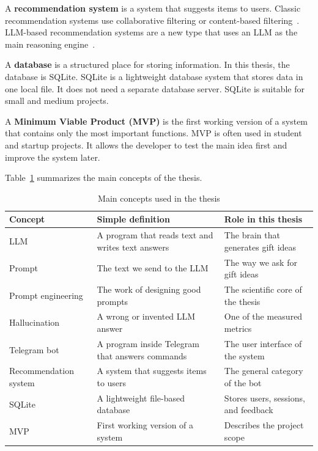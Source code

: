 A \textbf{recommendation system} is a system that suggests items to users. Classic recommendation systems use collaborative filtering or content-based filtering~\cite{ricci2015recommender}. LLM-based recommendation systems are a new type that uses an LLM as the main reasoning engine~\cite{wu2024survey}.

A \textbf{database} is a structured place for storing information. In this thesis, the database is SQLite. SQLite is a lightweight database system that stores data in one local file. It does not need a separate database server. SQLite is suitable for small and medium projects.

A \textbf{Minimum Viable Product (MVP)} is the first working version of a system that contains only the most important functions. MVP is often used in student and startup projects. It allows the developer to test the main idea first and improve the system later.

Table~\ref{tab:concepts} summarizes the main concepts of the thesis.

\begin{table}[H]
\centering
\caption{Main concepts used in the thesis}
\label{tab:concepts}
\begin{tabular}{p{3.5cm} p{5cm} p{5cm}}
\toprule
\textbf{Concept} & \textbf{Simple definition} & \textbf{Role in this thesis} \\
\midrule
LLM & A program that reads text and writes text answers & The brain that generates gift ideas \\
Prompt & The text we send to the LLM & The way we ask for gift ideas \\
Prompt engineering & The work of designing good prompts & The scientific core of the thesis \\
Hallucination & A wrong or invented LLM answer & One of the measured metrics \\
Telegram bot & A program inside Telegram that answers commands & The user interface of the system \\
Recommendation system & A system that suggests items to users & The general category of the bot \\
SQLite & A lightweight file-based database & Stores users, sessions, and feedback \\
MVP & First working version of a system & Describes the project scope \\
\bottomrule
\end{tabular}
\end{table}

